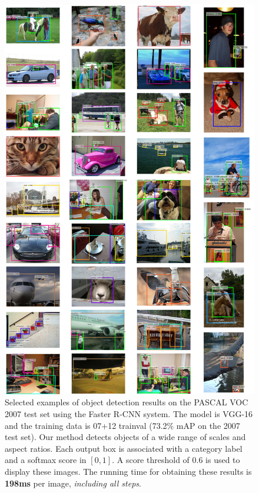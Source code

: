 \documentclass[10pt,journal,cspaper,compsoc]{IEEEtran}
\begin{document}
\begin{figure}[t]
\centering
\includegraphics[width=0.68\linewidth]{eps/results}
\caption{Selected examples of object detection results on the PASCAL VOC 2007 test set using the Faster R-CNN system. The model is VGG-16 and the training data is 07+12 trainval (73.2\% mAP on the 2007 test set). Our method detects objects of a wide range of scales and aspect ratios. Each output box is associated with a category label and a softmax score in $[0,1]$. A score threshold of 0.6 is used to display these images. The running time for obtaining these results is \textbf{198ms} per image, \emph{including all steps}.}
\label{fig:results}
\end{figure}
\end{document}
